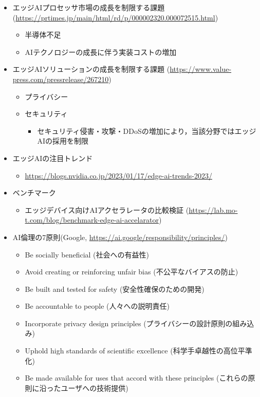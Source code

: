 \begin{itemize}
	\item エッジAIプロセッサ市場の成長を制限する課題 (\url{https://prtimes.jp/main/html/rd/p/000002320.000072515.html})
	\begin{itemize}
		\item 半導体不足
		\item AIテクノロジーの成長に伴う実装コストの増加
	\end{itemize}
	\item エッジAIソリューションの成長を制限する課題 (\url{https://www.value-press.com/pressrelease/267210})
	\begin{itemize}
		\item プライバシー
		\item セキュリティ
		\begin{itemize}
			\item セキュリティ侵害・攻撃・DDoSの増加により，当該分野ではエッジAIの採用を制限
		\end{itemize}
	\end{itemize}
	\item エッジAIの注目トレンド
	\begin{itemize}
		\item \url{https://blogs.nvidia.co.jp/2023/01/17/edge-ai-trends-2023/}
	\end{itemize}
	\item ベンチマーク
	\begin{itemize}
		\item エッジデバイス向けAIアクセラレータの比較検証 (\url{https://lab.mo-t.com/blog/benchmark-edge-ai-accelarator})
	\end{itemize}
	\item AI倫理の7原則(Google, \url{https://ai.google/responsibility/principles/})
	\begin{itemize}
		\item Be socially beneficial (社会への有益性)
		\item Avoid creating or reinforcing unfair bias (不公平なバイアスの防止)
		\item Be built and tested for safety (安全性確保のための開発)
		\item Be accountable to people (人々への説明責任)
		\item Incorporate privacy design principles (プライバシーの設計原則の組み込み)
		\item Uphold high standards of scientific excellence (科学手卓越性の高位平準化)
		\item Be made available for uses that accord with these principles (これらの原則に沿ったユーザへの技術提供)

\end{itemize}
\end{itemize}
